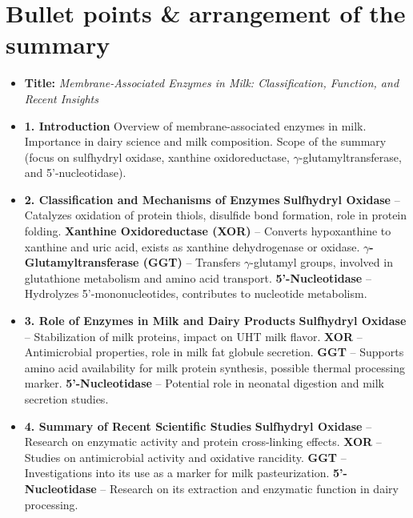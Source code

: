 \chapter{Bullet points \& arrangement of the summary}
\setlength{\headheight}{12.71342pt}
\addtolength{\topmargin}{-0.71342pt}

\begin{itemize}
    \item \textbf{Title:}  
    \subitem \textit{Membrane-Associated Enzymes in Milk: Classification, Function, and Recent Insights}

    \item \textbf{1. Introduction}  
    \subitem Overview of membrane-associated enzymes in milk.  
    \subitem Importance in dairy science and milk composition.  
    \subitem Scope of the summary (focus on sulfhydryl oxidase, xanthine oxidoreductase, $\gamma$-glutamyltransferase, and 5'-nucleotidase).  

    \item \textbf{2. Classification and Mechanisms of Enzymes}  
    \subitem \textbf{Sulfhydryl Oxidase} – Catalyzes oxidation of protein thiols, disulfide bond formation, role in protein folding.  
    \subitem \textbf{Xanthine Oxidoreductase (XOR)} – Converts hypoxanthine to xanthine and uric acid, exists as xanthine dehydrogenase or oxidase.  
    \subitem \textbf{$\gamma$-Glutamyltransferase (GGT)} – Transfers $\gamma$-glutamyl groups, involved in glutathione metabolism and amino acid transport.  
    \subitem \textbf{5'-Nucleotidase} – Hydrolyzes 5'-mononucleotides, contributes to nucleotide metabolism.  

    \item \textbf{3. Role of Enzymes in Milk and Dairy Products}  
    \subitem \textbf{Sulfhydryl Oxidase} – Stabilization of milk proteins, impact on UHT milk flavor.  
    \subitem \textbf{XOR} – Antimicrobial properties, role in milk fat globule secretion.  
    \subitem \textbf{GGT} – Supports amino acid availability for milk protein synthesis, possible thermal processing marker.  
    \subitem \textbf{5’-Nucleotidase} – Potential role in neonatal digestion and milk secretion studies.  

    \item \textbf{4. Summary of Recent Scientific Studies}  
    \subitem \textbf{Sulfhydryl Oxidase} – Research on enzymatic activity and protein cross-linking effects.  
    \subitem \textbf{XOR} – Studies on antimicrobial activity and oxidative rancidity.  
    \subitem \textbf{GGT} – Investigations into its use as a marker for milk pasteurization.  
    \subitem \textbf{5’-Nucleotidase} – Research on its extraction and enzymatic function in dairy processing.  


\end{itemize}
